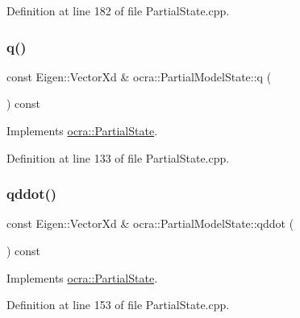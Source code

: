 Definition at line 182 of file Partial\+State.\+cpp.

\hypertarget{classocra_1_1PartialModelState_ac50f637a2ce55608b4159b7dac2c543d}{}\label{classocra_1_1PartialModelState_ac50f637a2ce55608b4159b7dac2c543d} 
\subsubsection{\texorpdfstring{q()}{q()}}
{\footnotesize\ttfamily const Eigen\+::\+Vector\+Xd \& ocra\+::\+Partial\+Model\+State\+::q (\begin{DoxyParamCaption}{ }\end{DoxyParamCaption}) const\hspace{0.3cm}{\ttfamily [virtual]}}



Implements \hyperlink{classocra_1_1PartialState_a28f537d2c569eddb7f7d6dbbea073226}{ocra\+::\+Partial\+State}.



Definition at line 133 of file Partial\+State.\+cpp.

\hypertarget{classocra_1_1PartialModelState_a9be011bf4005c0b964f857a82b2b2b23}{}\label{classocra_1_1PartialModelState_a9be011bf4005c0b964f857a82b2b2b23} 
\subsubsection{\texorpdfstring{qddot()}{qddot()}}
{\footnotesize\ttfamily const Eigen\+::\+Vector\+Xd \& ocra\+::\+Partial\+Model\+State\+::qddot (\begin{DoxyParamCaption}{ }\end{DoxyParamCaption}) const\hspace{0.3cm}{\ttfamily [virtual]}}



Implements \hyperlink{classocra_1_1PartialState_ad12359c11926c2151dc1459e88b9fedc}{ocra\+::\+Partial\+State}.



Definition at line 153 of file Partial\+State.\+cpp.

\hypertarget{classocra_1_1PartialModelState_a8707827d456a8c406d95c1cd4fc2e0b7}{}\label{classocra_1_1PartialModelState_a8707827d456a8c406d95c1cd4fc2e0b7} 
